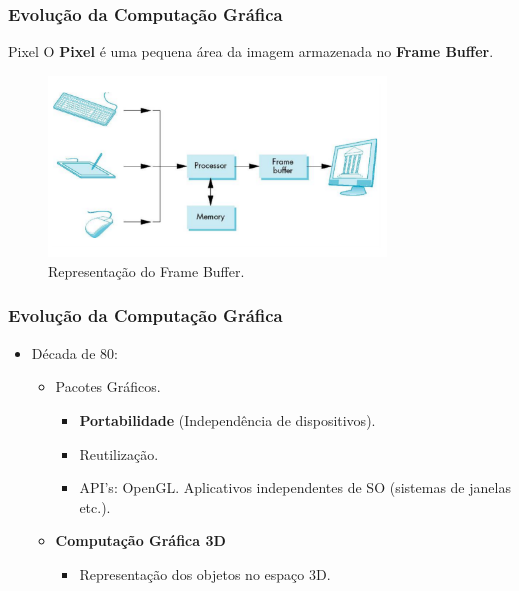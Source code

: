\documentclass{beamer}
\begin{document}
\begin{frame}
\frametitle{Evolução da Computação Gráfica}

\begin{block} {Pixel}
	O \textbf{Pixel} é uma pequena área da imagem armazenada no \textbf{Frame Buffer}.
	
\end{block}

	\begin{figure}[!h]
		\begin{center}
			\includegraphics[width=0.8\textwidth]{Figures/framebuffer}
			\caption{Representação do Frame Buffer.}
		\end{center}
		
	\end{figure}

\end{frame}



\begin{frame}
\frametitle{Evolução da Computação Gráfica}

\begin{block}

	\begin{itemize}
		\item<1-> Década de 80:
		\begin{itemize}
			\item<1-> Pacotes Gráficos.
				\begin{itemize}
					\item \textbf{Portabilidade} (Independência de dispositivos).
					\item Reutilização.
					\item API's: OpenGL. Aplicativos independentes de SO (sistemas de janelas etc.).
				\end{itemize}
			\item \textbf{Computação Gráfica 3D}
				\begin{itemize}
					\item Representação dos objetos no espaço 3D.
				\end{itemize}
			
		\end{itemize}
	\end{itemize}
\end{block}

\end{frame}
\end{document}

